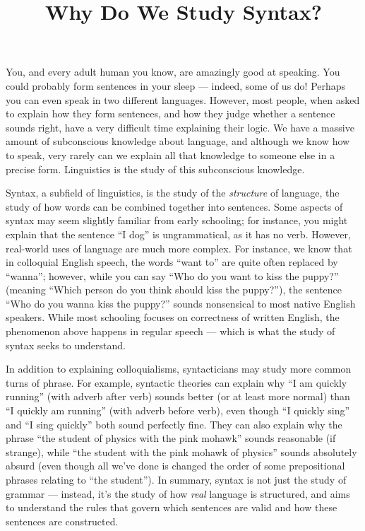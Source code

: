 \documentclass[twocolumn]{article}
\title{Why Do We Study Syntax?}
\begin{document}
You, and every adult human you know, are amazingly good at speaking. You could probably form sentences in your
sleep --- indeed, some of us do! Perhaps you can even speak in two different languages. However,
most people, when asked to explain how they form sentences, and how they judge whether a sentence sounds
right, have a very difficult time explaining their logic. We have a massive amount of subconscious
knowledge about language, and although we know how to speak, very rarely can we explain all that
knowledge to someone else in a precise form. Linguistics is the study of this subconscious
knowledge.

Syntax, a subfield of linguistics, is the study of the \emph{structure} of language, the study of
how words can be combined together into sentences. Some aspects of syntax may seem slightly familiar
from early schooling; for instance, you might explain that the sentence ``I dog'' is ungrammatical,
as it has no verb. However, real-world uses of language are much more complex. For instance, we know
that in colloquial English speech, the words ``want to'' are quite often replaced by ``wanna'';
however, while you can say ``Who do you want to kiss the puppy?'' (meaning ``Which person do you
think should kiss the puppy?''), the sentence ``Who do you wanna kiss the puppy?'' sounds
nonsensical to most native English speakers. While most schooling focuses on correctness of written
English, the phenomenon above happens in regular speech --- which is what the study of syntax seeks
to understand. 

In addition to explaining colloquialisms, syntacticians may study more common turns of phrase. For
example, syntactic theories can explain why ``I am quickly running'' (with adverb after verb) sounds
better (or at least more normal) than ``I quickly am running'' (with adverb before verb), even
though ``I quickly sing'' and ``I sing quickly'' both sound perfectly fine. They can also explain
why the phrase ``the student of physics with the pink mohawk'' sounds reasonable (if strange), while
``the student with the pink mohawk of physics'' sounds absolutely absurd (even though all we've done
is changed the order of some prepositional phrases relating to ``the student''). In summary, syntax
is not just the study of grammar --- instead, it's the study of how \emph{real} language is
structured, and aims to understand the rules that govern which sentences are valid and how these
sentences are constructed.
\end{document}
